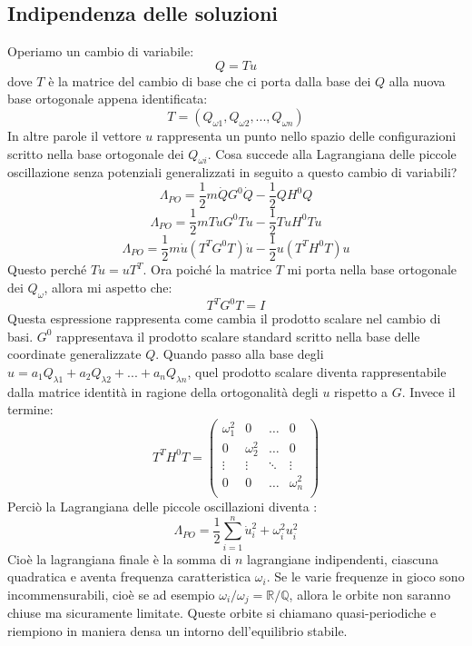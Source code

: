 \documentclass[a4paper,openany]{article}
\begin{document}
	\subsection{Indipendenza delle soluzioni}
	Operiamo un cambio di variabile:
	\begin{equation}\label{key}
		Q = Tu
	\end{equation} 
	dove $T$ è la matrice del cambio di base che ci porta dalla base dei $Q$ alla nuova base ortogonale appena identificata:
	$$
	T = (Q_{\omega1},Q_{\omega2}, ..., Q_{\omega n})
	$$
	In altre parole il vettore $u$ rappresenta un punto nello spazio delle configurazioni scritto nella base ortogonale dei $Q_{\omega i}$. Cosa succede alla Lagrangiana delle piccole oscillazione senza potenziali generalizzati in seguito a questo cambio di variabili?
	\begin{equation}\label{key}
		\Lambda_{PO} = \dfrac{1}{2}m\dot{Q}G^{0}\dot{Q} - \dfrac{1}{2}Q H^{0} Q
	\end{equation}
	$$
	\Lambda_{PO} = \dfrac{1}{2}mT\dot{u}G^{0}T\dot{u} - \dfrac{1}{2}Tu H^{0} Tu
	$$
	$$
	\Lambda_{PO} = \dfrac{1}{2}m\dot{u}(T^{T}G^{0}T)\dot{u} - \dfrac{1}{2}u(T^{T}H^{0}T)u
	$$
	Questo perché $Tu = uT^{T}$. Ora poiché la matrice $T$ mi porta nella base ortogonale dei $Q_{\omega}$, allora mi aspetto che:
	$$
	T^{T}G^{0} T = I
	$$
	Questa espressione rappresenta come cambia il prodotto scalare nel cambio di basi. $G^{0}$ rappresentava il prodotto scalare standard scritto nella base delle coordinate generalizzate $Q$. Quando passo alla base degli $u = a_{1}Q_{\lambda 1} + a_{2}Q_{\lambda 2} + ... + a_{n}Q_{\lambda n}$, quel prodotto scalare diventa rappresentabile dalla matrice identità in ragione della ortogonalità degli $u$ rispetto a $G$.
	Invece il termine:
	\begin{equation}\label{key}
		T^{T}H^{0}T = \begin{pmatrix}
			\omega_{1}^{2} & 0 & \dots & 0 \\
			0 & \omega_{2}^{2} & \dots & 0 \\
			\vdots & \vdots & \ddots & \vdots \\
			0 & 0 & \dots & \omega_{n}^{2}\\
		\end{pmatrix}
	\end{equation}
	Perciò la Lagrangiana delle piccole oscillazioni diventa 
	:
	\begin{equation}\label{key}
		\Lambda_{PO} = \dfrac{1}{2}\sum_{i=1}^{n}\dot{u}_{i}^{2} + \omega_{i}^{2}u_{i}^{2}
	\end{equation}
	Cioè la lagrangiana finale è la somma di $n$ lagrangiane indipendenti, ciascuna quadratica e aventa frequenza caratteristica $\omega_{i}$. Se le varie frequenze in gioco sono incommensurabili, cioè se ad esempio $\omega_{i}/\omega_{j} = \mathbb{R}/\mathbb{Q}$, allora le orbite non saranno chiuse ma sicuramente limitate. Queste orbite si chiamano quasi-periodiche e riempiono in maniera densa un intorno dell'equilibrio stabile.
\end{document}
